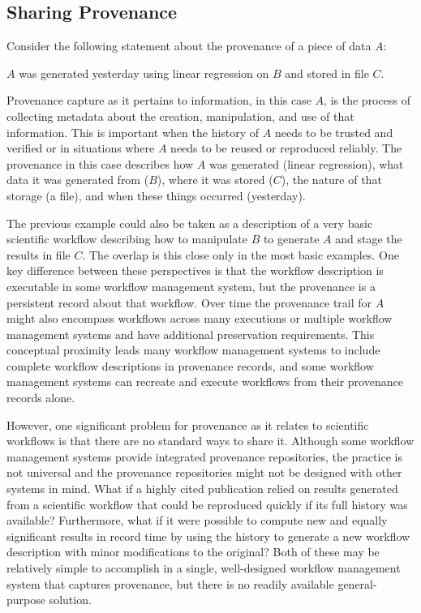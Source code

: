 \subsection{Sharing Provenance}
Consider the following statement about the provenance of a piece of data $A$:
\begin{displayquote}
    $A$ was generated yesterday using linear regression on $B$ and stored in
    file $C$.
\end{displayquote}
Provenance capture as it pertains to information, in this case $A$, is the
process of collecting metadata about the creation, manipulation, and use of that
information. This is important when the history of $A$ needs to be trusted and
verified or in situations where $A$ needs to be reused or reproduced reliably.
The provenance in this case describes how $A$ was generated (linear regression),
what data it was generated from ($B$), where it was stored ($C$), the nature of
that storage (a file), and when these things occurred (yesterday).

The previous example could also be taken as a description of a very basic
scientific workflow describing how to manipulate $B$ to generate $A$ and stage
the results in file $C$. The overlap is this close only in the most basic
examples. One key difference between these perspectives is that the workflow
description is executable in some workflow management system, but the provenance
is a persistent record about that workflow. Over time the provenance trail for
$A$ might also encompass workflows across many executions or multiple workflow
management systems and have additional preservation requirements. This
conceptual proximity leads many workflow management systems to include complete
workflow descriptions in provenance records, and some workflow management
systems can recreate and execute workflows from their provenance records alone.

However, one significant problem for provenance as it relates to scientific
workflows is that there are no standard ways to share it. Although some workflow
management systems provide integrated provenance repositories, the practice is
not universal and the provenance repositories might not be designed with other
systems in mind. What if a highly cited publication relied on results generated
from a scientific workflow that could be reproduced quickly if its full history
was available? Furthermore, what if it were possible to compute new and equally
significant results in record time by using the history to generate a new
workflow description with minor modifications to the original? Both of these may
be relatively simple to accomplish in a single, well-designed workflow
management system that captures provenance, but there is no readily available
general-purpose solution.

